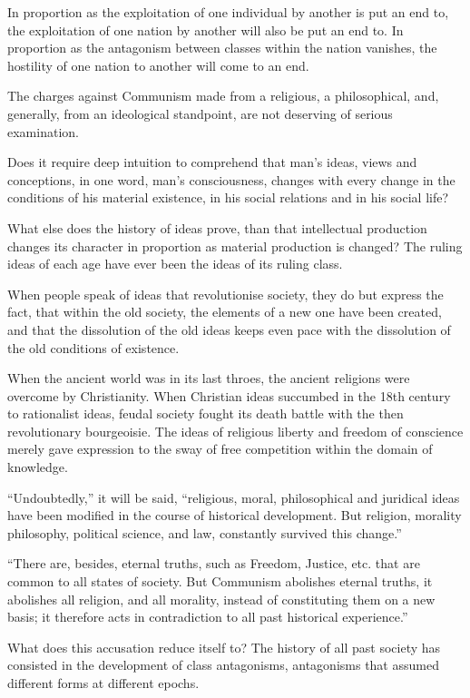 In proportion as the exploitation of one individual by another is put
an end to, the exploitation of one nation by another will also be put
an end to. In proportion as the antagonism between classes within the
nation vanishes, the hostility of one nation to another will come to an
end.

The charges against Communism made from a religious, a philosophical,
and, generally, from an ideological standpoint, are not deserving of
serious examination.

Does it require deep intuition to comprehend that man’s ideas, views
and conceptions, in one word, man’s consciousness, changes with every
change in the conditions of his material existence, in his social
relations and in his social life?

What else does the history of ideas prove, than that intellectual
production changes its character in proportion as material production
is changed? The ruling ideas of each age have ever been the ideas of
its ruling class.

When people speak of ideas that revolutionise society, they do but
express the fact, that within the old society, the elements of a new
one have been created, and that the dissolution of the old ideas keeps
even pace with the dissolution of the old conditions of existence.

When the ancient world was in its last throes, the ancient religions
were overcome by Christianity. When Christian ideas succumbed in the
18th century to rationalist ideas, feudal society fought its death
battle with the then revolutionary bourgeoisie. The ideas of religious
liberty and freedom of conscience merely gave expression to the sway of
free competition within the domain of knowledge.

“Undoubtedly,” it will be said, “religious, moral, philosophical and
juridical ideas have been modified in the course of historical
development. But religion, morality philosophy, political science, and
law, constantly survived this change.”

“There are, besides, eternal truths, such as Freedom, Justice, etc.
that are common to all states of society. But Communism abolishes
eternal truths, it abolishes all religion, and all morality, instead of
constituting them on a new basis; it therefore acts in contradiction to
all past historical experience.”

What does this accusation reduce itself to? The history of all past
society has consisted in the development of class antagonisms,
antagonisms that assumed different forms at different epochs.

